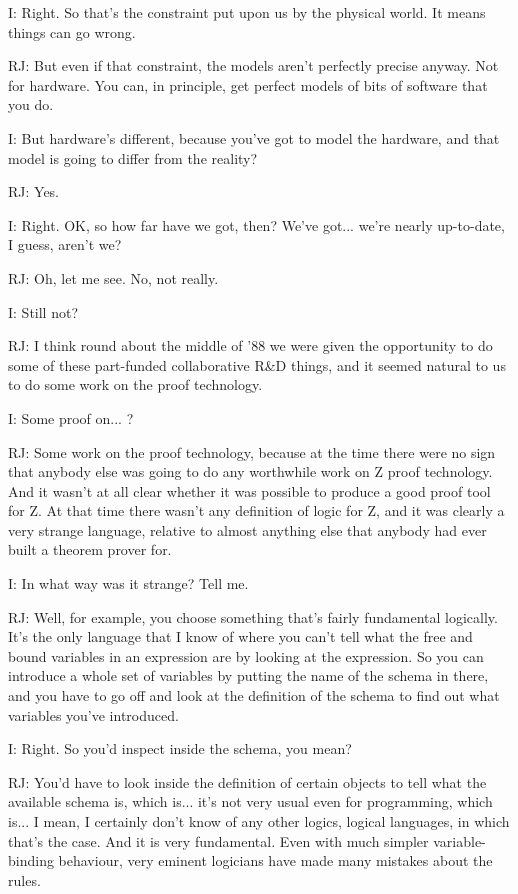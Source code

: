 \documentclass[10pt,titlepage]{book}
\begin{document}
I: Right. So that's the constraint put upon us by the physical world. It means things can go wrong.

RJ: But even if that 	constraint, the models aren't perfectly precise anyway. Not for hardware. You can, in principle, get perfect models of bits of software that you do.

I: But hardware's different, because you've got to model the hardware, and that model is going to differ from the reality?

RJ: Yes.

I: Right. OK, so how far have we got, then? We've got... we're nearly up-to-date, I guess, aren't we?

RJ: Oh, let me see. No, not really.

I: Still not?

RJ: I think round about the middle of '88 we were given the opportunity to do some of these part-funded collaborative R\&D things, and it seemed natural to us to do some work on the proof technology.

I: Some proof on... ?

RJ: Some work on the proof technology, because at the time there were no sign that anybody else was going to do any worthwhile work on Z proof technology. And it wasn't at all clear whether it was possible to produce a good proof tool for Z. At that time there wasn't any definition of logic for Z, and it was clearly a very strange language, relative to almost anything else that anybody had ever built a theorem prover for.

I: In what way was it strange? Tell me.

RJ: Well, for example, you choose something that's fairly fundamental logically. It's the only language that I know of where you can't tell what the free and bound variables in an expression are by looking at the expression. So you can introduce a whole set of variables by putting the name of the schema in there, and you have to go off and look at the definition of the schema to find out what variables you've introduced.

I: Right. So you'd inspect inside the schema, you mean?

RJ: You'd have to look inside the definition of certain objects to tell what the available schema is, which is... it's not very usual even for programming, which is... I mean, I certainly don't know of any other logics, logical languages, in which that's the case. And it is very fundamental. Even with much simpler variable-binding behaviour, very eminent logicians have made many mistakes about the rules.
\end{document}
